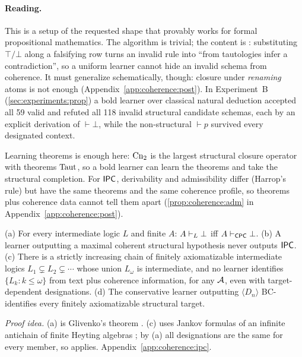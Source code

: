 \paragraph{Reading.} This is a setup of the requested shape that provably works for formal propositional mathematics. The algorithm is trivial; the content is : substituting $\top/\bot$ along a falsifying row turns an invalid rule into ``from tautologies infer a contradiction'', so a uniform learner cannot hide an invalid schema from coherence. It must generalize schematically, though: closure under \emph{renaming} atoms is not enough (Appendix~\ref{app:coherence:post}). In Experiment~B (\cref{sec:experiments:prop}) a bold learner over classical natural deduction accepted all 59 valid and refuted all 118 invalid structural candidate schemas, each by an explicit derivation of $\vdash\bot$, while the non-structural $\vdash p$ survived every designated context.

Learning theorems is enough here: $\mathrm{Cn}_2$ is the largest structural closure operator with theorems $\mathrm{Taut}$, so a bold learner can learn the theorems and take the structural completion. For $\mathsf{IPC}$, derivability and admissibility differ (Harrop's rule) but have the same theorems and the same coherence profile, so theorems plus coherence data cannot tell them apart (\cref{prop:coherence:adm} in Appendix~\ref{app:coherence:post}).

\begin{theorem}\label{thm:coherence:ipc}
\textup{(a)} For every intermediate logic $L$ and finite $A$: $A\vdash_L\bot$ iff $A\vdash_{\mathsf{CPC}}\bot$.
\textup{(b)} A learner outputting a maximal coherent structural hypothesis never outputs $\mathsf{IPC}$.
\textup{(c)} There is a strictly increasing chain of finitely axiomatizable intermediate logics $L_1\subsetneq L_2\subsetneq\cdots$ whose union $L_\omega$ is intermediate, and no learner identifies $\{L_k:k\le\omega\}$ from text plus coherence information, for any $\mathcal{A}$, even with target-dependent designations.
\textup{(d)} The conservative learner outputting $\langle D_n\rangle$ BC-identifies every finitely axiomatizable structural target.
\end{theorem}

\noindent\emph{Proof idea.} (a) is Glivenko's theorem \citep{glivenko1929quelques}. (c) uses Jankov formulas of an infinite antichain of finite Heyting algebras \citep{jankov1968construction,chagrov1997modal}; by (a) all designations are the same for every member, so  applies. Appendix~\ref{app:coherence:ipc}.


